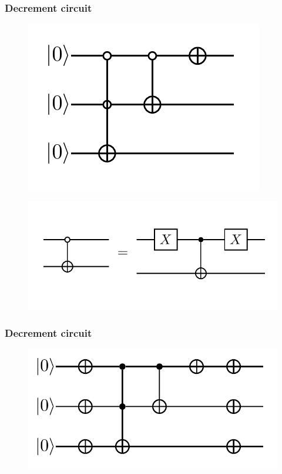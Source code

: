 \documentclass{beamer}
\begin{document}
\begin{frame}
    \frametitle{Decrement circuit}
    \begin{figure}[h!]
        \includegraphics[scale=0.5]{img/decrement_circuit.png}
        \centering
    \end{figure}
    \begin{figure}[h!]
        \includegraphics[scale=0.3]{img/ncn_equiv.png}
        \centering
    \end{figure}
\end{frame}

\begin{frame}
    \frametitle{Decrement circuit}
    \begin{figure}[h!]
        \includegraphics[scale=0.5]{img/decr.png}
        \centering
    \end{figure}
\end{frame}
\end{document}
